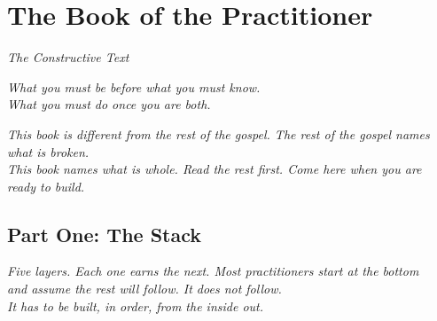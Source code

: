 
\chapter{The Book of the Practitioner}
\begin{center}
  \small\itshape The Constructive Text
\end{center}
\vspace{0.5em}
\begin{center}
  \itshape What you must be before what you must know.\\
  What you must do once you are both.
\end{center}
\vspace{1.5em}

\begin{center}
\small\itshape
This book is different from the rest of the gospel. The rest of the gospel names what is broken.\\
This book names what is whole. Read the rest first. Come here when you are ready to build.
\end{center}

\section*{Part One: The Stack}
\begin{center}
  \small\itshape Five layers. Each one earns the next. Most practitioners start at the bottom\\
  and assume the rest will follow. It does not follow.\\
  It has to be built, in order, from the inside out.
\end{center}
\vspace{2em}



\makeatletter
{}
\makeatother


